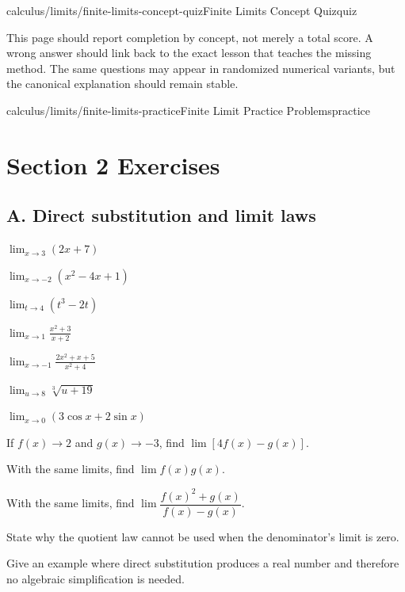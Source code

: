 \begin{webpage}{calculus/limits/finite-limits-concept-quiz}{Finite Limits Concept Quiz}{quiz}
\begin{bgsummary}[title={Quiz use on the website}]
This page should report completion by concept, not merely a total score. A wrong answer should link back to the exact lesson that teaches the missing method. The same questions may appear in randomized numerical variants, but the canonical explanation should remain stable.
\end{bgsummary}
\end{webpage}

\begin{webpage}{calculus/limits/finite-limits-practice}{Finite Limit Practice Problems}{practice}
\section*{Section 2 Exercises}

\subsection*{A. Direct substitution and limit laws}
\begin{bgexercises}[label=\textbf{2.\arabic*}]
  \item \(\displaystyle\lim_{x\to3}(2x+7)\)
  \item \(\displaystyle\lim_{x\to-2}(x^2-4x+1)\)
  \item \(\displaystyle\lim_{t\to4}(t^3-2t)\)
  \item \(\displaystyle\lim_{x\to1}\frac{x^2+3}{x+2}\)
  \item \(\displaystyle\lim_{x\to-1}\frac{2x^2+x+5}{x^2+4}\)
  \item \(\displaystyle\lim_{u\to8}\sqrt[3]{u+19}\)
  \item \(\displaystyle\lim_{x\to0}(3\cos x+2\sin x)\)
  \item If \(f(x)\to2\) and \(g(x)\to-3\), find \(\lim[4f(x)-g(x)]\).
  \item With the same limits, find \(\lim f(x)g(x)\).
  \item With the same limits, find \(\lim\dfrac{f(x)^2+g(x)}{f(x)-g(x)}\).
  \item State why the quotient law cannot be used when the denominator's limit is zero.
  \item Give an example where direct substitution produces a real number and therefore no algebraic simplification is needed.
\end{bgexercises}


\end{webpage}
